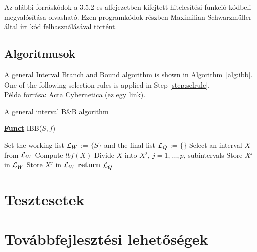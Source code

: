 Az alábbi forráskódok a 3.5.2-es alfejezetben kifejtett hitelesítési funkció kódbeli megvalósítása olvasható. Ezen programkódok részben Maximilian Schwarzmüller által írt kód felhasználásával történt.




\subsection{Algoritmusok} %

A general Interval Branch and Bound algorithm is shown in Algorithm~\ref{alg:ibb}. One of the following selection rules is applied in Step \ref{step:selrule}.\\
Példa forrása: \href{https://www.inf.u-szeged.hu/actacybernetica/}{Acta Cybernetica (ez egy link)}.

\begin{algorithm}[H]
\caption{A general interval B\&B algorithm} 
\label{alg:ibb} 
\textbf{\underline{Funct}} IBB($S,f$)
\begin{algorithmic}[1] %
\State Set the working list ${\cal L}_W$ := $\{S\}$ and the final list ${\cal L}_Q$ := $\{\}$     
 \label{alg:igoend}
	\State  Select an interval $X$ from ${\cal L}_W$ \label{step:selrule}  
	\State Compute $lbf(X)$ 		  
	 
		\State Divide $X$ into $X^j,\ j=1,\dots, p$, subintervals   
			 
				\State Store $X^j$ in ${\cal L}_W$ 
			\Else
				\State Store $X^j$ in ${\cal L}_W$ 
			\EndIf
		\EndFor  
	\EndIf
\EndWhile
\State \textbf{return} ${\cal L}_Q$
\end{algorithmic}
\end{algorithm}

\section{Tesztesetek}

\section{Továbbfejlesztési lehetőségek}